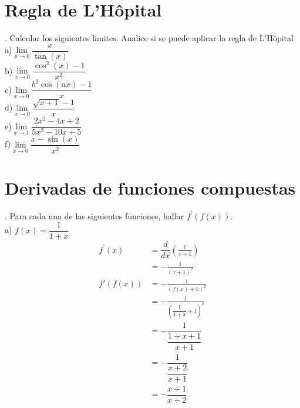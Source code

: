 \documentclass[letterpaper]{article}
\newcommand{\fp}[1]{#1^{\prime}}
\newcommand{\de}{\dfrac{d}{dx}}
\begin{document}
\section*{Regla de L’Hôpital}

. Calcular los siguientes limites. Analice si se puede aplicar la regla de L’Hôpital\\

a)$ \lim\limits_{ x \rightarrow 0} \dfrac{x}{\tan(x)} $\\


b)$ \lim\limits_{ x \rightarrow 0} \dfrac{\cos^{2}(x) -1}{x^{2}} $\\


c)$ \lim\limits_{ x \rightarrow 0} \dfrac{b^{2}\cos(ax) -1}{x} $\\


d)$ \lim\limits_{ x \rightarrow 0} \dfrac{\sqrt{x+1} -1}{x} $\\


e)$ \lim\limits_{ x \rightarrow 1} \dfrac{2x^{2}-4x+2}{5x^{2}-10x+5} $\\


f)$ \lim\limits_{ x \rightarrow 0} \dfrac{x- \sin(x)}{x^{2}} $\\


\section*{Derivadas de funciones compuestas}

. Para cada una de las siguientes funciones, hallar $ \fp{f} (f (x)) $.\\

a) $ f(x) = \dfrac{1}{1+x} $\\


\begin{align*}
	\fp{f}(x) &= \de \left(\frac{1}{x+1}\right)\\
	&= - \frac{1}{(x+1)^2}\\
	f'(f(x))	&= - \frac{1}{(f(x)+1)^2}\\
	&= - \frac{1}{\left(\dfrac{1}{1+x}+1\right)^2}\\
	& = - \dfrac{1}{\dfrac{1+x+1}{x+1}}\\
	& = - \dfrac{1}{\dfrac{x+2}{x+1}}\\
	& = - \dfrac{x+1}{x+2}\\
\end{align*}
\end{document}
